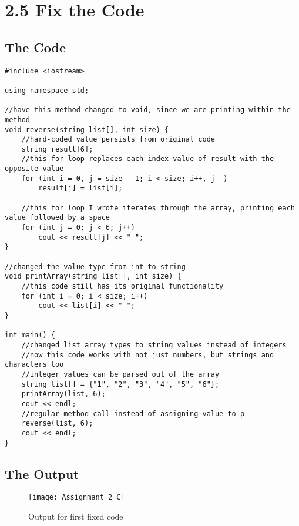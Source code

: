 \documentclass[11pt]{article}
\begin{document}
\section*{2.5 Fix the Code}
\subsection*{The Code}
\begin{lstlisting}
#include <iostream>

using namespace std;

//have this method changed to void, since we are printing within the method
void reverse(string list[], int size) {
    //hard-coded value persists from original code
    string result[6];
    //this for loop replaces each index value of result with the opposite value
    for (int i = 0, j = size - 1; i < size; i++, j--)
        result[j] = list[i];

    //this for loop I wrote iterates through the array, printing each value followed by a space
    for (int j = 0; j < 6; j++)
        cout << result[j] << " ";
}

//changed the value type from int to string
void printArray(string list[], int size) {
    //this code still has its original functionality
    for (int i = 0; i < size; i++)
        cout << list[i] << " ";
}

int main() {
    //changed list array types to string values instead of integers
    //now this code works with not just numbers, but strings and characters too
    //integer values can be parsed out of the array
    string list[] = {"1", "2", "3", "4", "5", "6"};
    printArray(list, 6);
    cout << endl;
    //regular method call instead of assigning value to p
    reverse(list, 6);
    cout << endl;
}
\end{lstlisting}

\subsection{The Output}
\begin{figure}[H]
    \centering
    \texttt{[image: Assignmant\_2\_C]}
    \caption{Output for first fixed code}
    \label{fig:Part 2C}
\end{figure}
\end{document}
